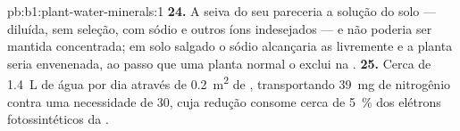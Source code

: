 \begin{solution}{pb:b1:plant-water-minerals:1}
\textbf{24.} A seiva do seu  pareceria a solução do solo ---
diluída, sem seleção, com sódio e outros íons indesejados --- e não
poderia ser mantida concentrada; em solo salgado o sódio alcançaria as
 livremente e a planta seria envenenada, ao passo que uma planta
normal o exclui na .
\textbf{25.} Cerca de \qty{1.4}{L} de água por dia através de
\qty{0.2}{m^2} de , transportando \qty{39}{mg} de nitrogênio
contra uma necessidade de \qty{30}{}, cuja redução consome cerca de
\qty{5}{\%} dos elétrons fotossintéticos da .
\end{solution}
